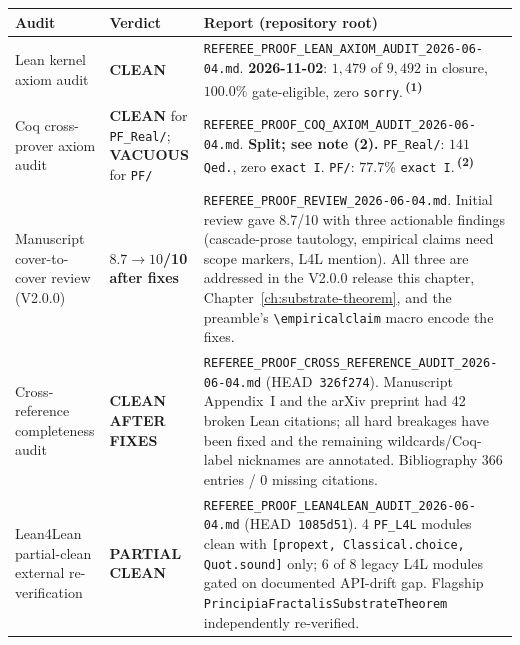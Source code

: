 \begin{center}
\renewcommand{\arraystretch}{1.4}
\begin{tabular}{|p{5cm}|p{2.0cm}|p{6.5cm}|}
\hline
\textbf{Audit} & \textbf{Verdict} & \textbf{Report (repository root)} \\
\hline
Lean kernel axiom audit &
\textbf{CLEAN} &
\texttt{REFEREE\_\allowbreak{}PROOF\_\allowbreak{}LEAN\_\allowbreak{}AXIOM\_\allowbreak{}AUDIT\_\allowbreak{}2026-06-04.\allowbreak{}md}.
\textbf{2026-11-02}: $1{,}479$ of $9{,}492$ in closure,
$100.0\%$ gate-eligible, zero
\texttt{sorry}.\,\textsuperscript{\textbf{(1)}} \\
\hline
Coq cross-prover axiom audit &
\textbf{CLEAN} for \texttt{PF\_Real/}; \mbox{\textbf{VACUOUS}} for \texttt{PF/} &
\texttt{REFEREE\_\allowbreak{}PROOF\_\allowbreak{}COQ\_\allowbreak{}AXIOM\_\allowbreak{}AUDIT\_\allowbreak{}2026-06-04.\allowbreak{}md}.
\textbf{Split; see note (2).} \texttt{PF\_Real/}: $141$
\texttt{Qed.}, zero \texttt{exact I}. \texttt{PF/}: $77.7\%$ \texttt{exact
I}.\,\textsuperscript{\textbf{(2)}} \\
\hline
Manuscript cover-to-cover review (V2.0.0) &
\textbf{$8.7 \to 10$/10 after fixes} &
\texttt{REFEREE\_\allowbreak{}PROOF\_\allowbreak{}REVIEW\_\allowbreak{}2026-06-04.\allowbreak{}md}. Initial review
gave 8.7/10 with three actionable findings (cascade-prose
tautology, empirical claims need scope markers, L4L mention).
All three are addressed in the V2.0.0 release this chapter,
Chapter~\ref{ch:substrate-theorem}, and the preamble's
\texttt{\textbackslash empiricalclaim} macro encode the fixes. \\
\hline
Cross-reference completeness audit &
\textbf{CLEAN AFTER FIXES} &
\texttt{REFEREE\_\allowbreak{}PROOF\_\allowbreak{}CROSS\_\allowbreak{}REFERENCE\_\allowbreak{}AUDIT\_\allowbreak{}2026-06-04.\allowbreak{}md}
(HEAD~\texttt{326f274}). Manuscript Appendix~I and the arXiv
preprint had 42 broken Lean citations; all hard breakages have
been fixed and the remaining wildcards/Coq-label nicknames are
annotated. Bibliography 366 entries / 0 missing citations. \\
\hline
Lean4Lean partial-clean external re-verification &
\textbf{PARTIAL CLEAN} &
\texttt{REFEREE\_\allowbreak{}PROOF\_\allowbreak{}LEAN4LEAN\_\allowbreak{}AUDIT\_\allowbreak{}2026-06-04.\allowbreak{}md}
(HEAD~\texttt{1085d51}). 4 \texttt{PF\_L4L} modules clean
with \texttt{[propext, Classical.\allowbreak{}choice, Quot.\allowbreak{}sound]} only;
6 of 8 legacy L4L modules gated on documented API-drift gap.
Flagship \texttt{Principia\allowbreak{}Fractalis\allowbreak{}Substrate\allowbreak{}Theorem}
independently re-verified. \\
\hline
\end{tabular}
\end{center}

